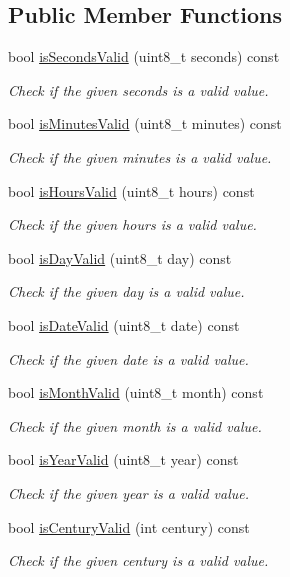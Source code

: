 \subsection*{Public Member Functions}
\begin{DoxyCompactItemize}
\item 
bool \mbox{\hyperlink{classtime_aeba296b9c9c6ec09250f98a20062a500}{is\+Seconds\+Valid}} (uint8\+\_\+t seconds) const
\begin{DoxyCompactList}\small\item\em Check if the given seconds is a valid value. \end{DoxyCompactList}\item 
bool \mbox{\hyperlink{classtime_adafa6fb7a20aee5e865a51576ab9340b}{is\+Minutes\+Valid}} (uint8\+\_\+t minutes) const
\begin{DoxyCompactList}\small\item\em Check if the given minutes is a valid value. \end{DoxyCompactList}\item 
bool \mbox{\hyperlink{classtime_afe3fbaa007cbc8072b36c8bd2a556365}{is\+Hours\+Valid}} (uint8\+\_\+t hours) const
\begin{DoxyCompactList}\small\item\em Check if the given hours is a valid value. \end{DoxyCompactList}\item 
bool \mbox{\hyperlink{classtime_a126cf22d6b3a7a36603e2cb390082d2f}{is\+Day\+Valid}} (uint8\+\_\+t day) const
\begin{DoxyCompactList}\small\item\em Check if the given day is a valid value. \end{DoxyCompactList}\item 
bool \mbox{\hyperlink{classtime_aa678e8f53a12adda2f807e6a44ebc46d}{is\+Date\+Valid}} (uint8\+\_\+t date) const
\begin{DoxyCompactList}\small\item\em Check if the given date is a valid value. \end{DoxyCompactList}\item 
bool \mbox{\hyperlink{classtime_a92c265ce96b24f9bdfa960144a0bce11}{is\+Month\+Valid}} (uint8\+\_\+t month) const
\begin{DoxyCompactList}\small\item\em Check if the given month is a valid value. \end{DoxyCompactList}\item 
bool \mbox{\hyperlink{classtime_ad6269d0f650cfc32e0ac83b09816abad}{is\+Year\+Valid}} (uint8\+\_\+t year) const
\begin{DoxyCompactList}\small\item\em Check if the given year is a valid value. \end{DoxyCompactList}\item 
bool \mbox{\hyperlink{classtime_a01413b7e5754345cf032cc7afa13efb0}{is\+Century\+Valid}} (int century) const
\begin{DoxyCompactList}\small\item\em Check if the given century is a valid value. \end{DoxyCompactList}\end{DoxyCompactItemize}
